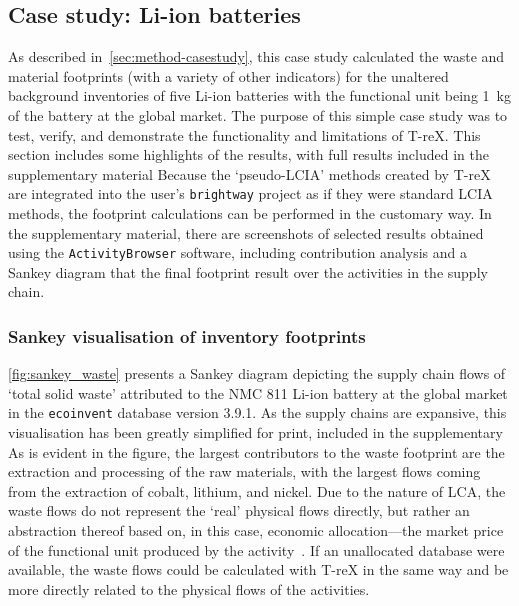 \documentclass[a4paper,fleqn]{cas-dc}
\begin{document}
\subsection{Case study: Li-ion batteries}\label{sec:results-casestudy}

As described in~\autoref{sec:method-casestudy}, this case study calculated the
waste and material footprints (with a variety of other indicators) for the
unaltered background inventories of five Li-ion batteries with the functional
unit being 1~kg of the battery at the global market. The purpose of this simple
case study was to test, verify, and demonstrate the functionality and
limitations of T-reX. This section includes some highlights of the results,
with full results included in the supplementary material \protect{}
\protect{} Because the `pseudo-LCIA' methods created by
T-reX are integrated into the user's \texttt{brightway} project as if they were
standard LCIA methods, the footprint calculations can be performed in the
customary way. In the supplementary material, there are screenshots of selected
results obtained using the \texttt{ActivityBrowser} software, including
contribution analysis and a Sankey diagram that \protect{} \protect{} the final
footprint result over the activities in the supply chain.

\subsubsection[Sankey visualisation of  flow inventory footprints]{Sankey visualisation of \protect{} \protect{} inventory footprints}\label{sec:results-case_study-sankey}

\autoref{fig:sankey_waste} presents a \protect{} Sankey diagram depicting the supply chain flows of `total solid waste' attributed to the NMC 811 Li-ion battery at the global market in the \texttt{ecoinvent} database version 3.9.1. As the supply chains are expansive, this visualisation has been greatly simplified \protect{} for print, \protect{} \protect{} included in the supplementary \protect{} \protect{} As is evident in the figure, the largest contributors to the waste footprint are the extraction and processing of the raw materials, with the largest flows coming from the extraction of cobalt, lithium, and nickel. Due to the nature of LCA, the waste flows do not represent the `real' physical flows directly, but rather an abstraction thereof based on, in this case, economic allocation---the market price of the functional unit produced by the activity~\citep{guinee2004economicallocation}. If an unallocated database were available, the waste flows could be calculated with T-reX in the same way and \protect{} be more directly related to the physical flows of the activities.
\end{document}
